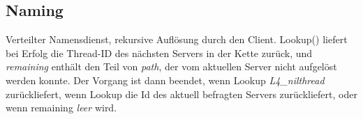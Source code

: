 \subsection{Naming}





Verteilter Namensdienst, rekursive Auflösung durch den Client. Lookup() liefert bei Erfolg die Thread-ID des nächsten Servers in der Kette zurück, und \textit{remaining} enthält den Teil von \textit{path}, der vom aktuellen Server nicht aufgelöst werden konnte. Der Vorgang ist dann beendet, wenn Lookup \textit{L4\_nilthread} zurückliefert, wenn Lookup die Id des aktuell befragten Servers zurückliefert, oder wenn remaining \textit{leer} wird.